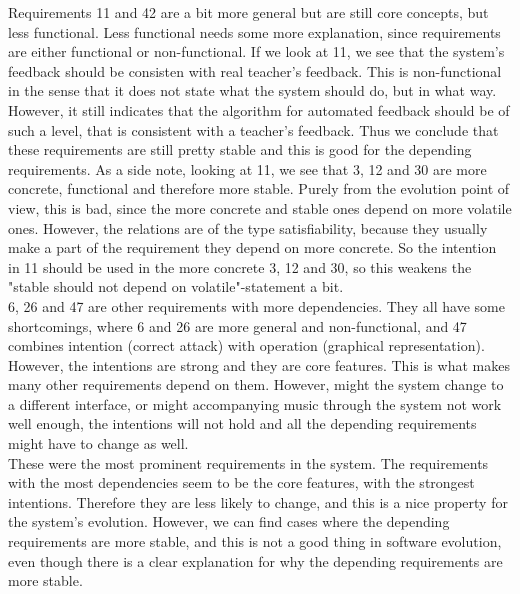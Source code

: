 \documentclass[a4paper,11pt]{article}
\begin{document}
		Requirements 11 and 42 are a bit more general but are still core concepts, but less functional. Less functional needs some more explanation, since requirements are either functional or non-functional. If we look at 11, we see that the system's feedback should be consisten with real teacher's feedback. This is non-functional in the sense that it does not state what the system should do, but in what way. However, it still indicates that the algorithm for automated feedback should be of such a level, that is consistent with a teacher's feedback. Thus we conclude that these requirements are still pretty stable and this is good for the depending requirements. As a side note, looking at 11, we see that 3, 12 and 30 are more concrete, functional and therefore more stable. Purely from the evolution point of view, this is bad, since the more concrete and stable ones depend on more volatile ones. However, the relations are of the type satisfiability, because they usually make a part of the requirement they depend on more concrete. So the intention in 11 should be used in the more concrete 3, 12 and 30, so this weakens the "stable should not depend on volatile"-statement a bit. \\
		6, 26 and 47 are other requirements with more dependencies. They all have some shortcomings, where 6 and 26 are more general and non-functional, and 47 combines intention (correct attack) with operation (graphical representation). However, the intentions are strong and they are core features. This is what makes many other requirements depend on them. However, might the system change to a different interface, or might accompanying music through the system not work well enough, the intentions will not hold and all the depending requirements might have to change as well. \\
		These were the most prominent requirements in the system. The requirements with the most dependencies seem to be the core features, with the strongest intentions. Therefore they are less likely to change, and this is a nice property for the system's evolution. However, we can find cases where the depending requirements are more stable, and this is not a good thing in software evolution, even though there is a clear explanation for why the depending requirements are more stable.
\end{document}
